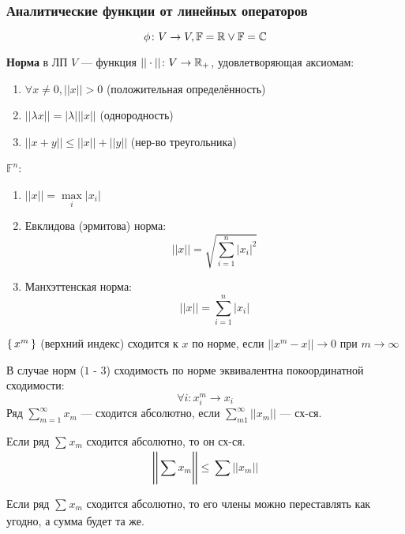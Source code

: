 \subsubsection{Аналитические функции от линейных операторов}
\[
    \phi \colon V \rightarrow V, \mathbb{F} = \mathbb{R} \lor \mathbb{F} = \mathbb{C}
\]
\begin{definition}
    \textbf{Норма} в ЛП $V$ --- функция $||\cdot|| \colon V \rightarrow \mathbb{R}_+$, удовлетворяющая аксиомам:
    \begin{enumerate}
        \item $\forall x \neq 0, ||x|| > 0$ (положительная определённость)
        \item $|| \lambda x || = |\lambda| ||x||$ (однородность)
        \item $|| x + y || \leq ||x|| + ||y||$ (нер-во треугольника)
    \end{enumerate}
\end{definition}
\begin{example}
$\mathbb{F}^{n}$:
\begin{enumerate}
    \item $||x|| = \underset{i}{\max} |x_i|$
    \item Евклидова (эрмитова) норма:
        \[
        ||x|| = \sqrt{\sum_{i = 1}^{n} |x_i|^{2}}
        \]
    \item Манхэттенская норма:
        \[
        ||x|| = \sum_{i = 1}^{n} |x_i|
        \]
\end{enumerate}
\end{example}
\begin{definition}
   $\set{x^{m}}$ (верхний индекс)  сходится к $x$ по норме, если $||x^{m} - x|| \rightarrow 0$ при $m \rightarrow \infty$
\end{definition}
\begin{note}
    В случае норм ($1$ - $3$) сходимость по норме эквивалентна покоординатной сходимости:
    \[
    \forall i\colon x_i^{m} \rightarrow x_i
    \]
    Ряд $\sum_{m = 1}^{\infty} x_m$ --- сходится абсолютно, если $\sum_{m  1}^{\infty} ||x_m||$ --- сх-ся.
\end{note}
\begin{statement}
    Если ряд $\sum_{}^{} x_m$ сходится абсолютно, то он сх-ся.
    \[
    \left|\left|\sum_{}^{} x_m\right|\right| \leq \sum_{}^{} ||x_m||
    \]
\end{statement}
\begin{statement}
    Если ряд $\sum_{}^{} x_m$ сходится абсолютно, то его члены можно переставлять как угодно, а сумма будет та же.
\end{statement}
